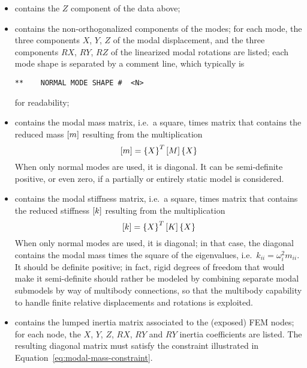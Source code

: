\begin{itemize}
\item {} contains the $Z$ component of the data above;

\item {} contains the non-orthogonalized components 
of the  modes; for each mode, the three components 
$X$, $Y$, $Z$ of the modal displacement, and the three components
$RX$, $RY$, $RZ$ of the linearized modal rotations are listed;
each mode shape is separated by a comment line, which typically is
\begin{verbatim}
**    NORMAL MODE SHAPE #  <N>
\end{verbatim}
for readability;

\item {} contains the modal mass matrix,
i.e.\ a square,  times  matrix that contains
the reduced mass $\left[ m \right]$ resulting from the multiplication
\begin{equation}
	\label{eq:modal-mass-constraint}
	\left[ m \right] = \left\{ X \right\}^T \left[ M \right] \left\{ X \right\}
\end{equation}
When only normal modes are used, it is diagonal.
It can be semi-definite positive, or even zero, if a partially 
or entirely static model is considered.

\item {} contains the modal stiffness matrix,
i.e.\ a square,  times  matrix that contains
the reduced stiffness $\left[ k \right]$ resulting from the multiplication
\begin{displaymath}
	\left[ k \right] = \left\{ X \right\}^T \left[ K \right] \left\{ X \right\}
\end{displaymath}
When only normal modes are used, it is diagonal; in that case,
the diagonal contains the modal mass times the square 
of the eigenvalues, i.e.\ $k_{ii} = \omega_i^2 m_{ii}$.
It should be definite positive; in fact, rigid degrees of freedom
that would make it semi-definite should rather be modeled by combining
separate modal submodels by way of multibody connections, so that
the multibody capability to handle finite relative displacements
and rotations is exploited.

\item {} contains the lumped inertia matrix
associated to the  (exposed) FEM nodes;
for each node, the $X$, $Y$, $Z$, $RX$, $RY$ and $RY$ inertia
coefficients are listed.
The resulting diagonal matrix must satisfy the constraint
illustrated in Equation~\ref{eq:modal-mass-constraint}.
\end{itemize}


